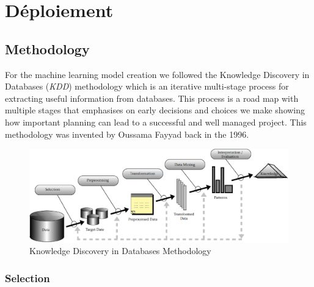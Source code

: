 \chapter{Déploiement}

\section{Methodology}
For the machine learning model creation we followed the Knowledge Discovery in Databases (\textit{KDD})\cite{3} methodology which is an iterative multi-stage process for extracting useful information from databases. This process is a road map with multiple stages that emphasises on early decisions and choices we make showing how important planning can lead to a successful and well managed project. This methodology was invented by Oussama Fayyad back in the 1996.

\begin{figure}[h!]
    \centering
    \includegraphics{chapters/KDD.png}
    \caption{Knowledge Discovery in Databases Methodology}
    \label{fig:Knowledge Discovery in Databases Methodology}
\end{figure}

\clearpage

\subsection{Selection}

